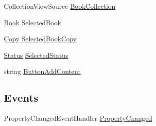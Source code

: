 \begin{DoxyCompactItemize}
\item 
Collection\+View\+Source \mbox{\hyperlink{class_easy_library_application_1_1_w_p_f_1_1_view_model_1_1_c_r_u_d_book_copies_view_model_aabe62d67d4900559ca92487dcaae6f9c}{Book\+Collection}}
\item 
\mbox{\hyperlink{class_easy_library_application_1_1_w_p_f_1_1_model_1_1_book}{Book}} \mbox{\hyperlink{class_easy_library_application_1_1_w_p_f_1_1_view_model_1_1_c_r_u_d_book_copies_view_model_ac1b60964461217810ccf17c7a8083fb8}{Selected\+Book}}
\item 
\mbox{\hyperlink{class_easy_library_application_1_1_w_p_f_1_1_model_1_1_copy}{Copy}} \mbox{\hyperlink{class_easy_library_application_1_1_w_p_f_1_1_view_model_1_1_c_r_u_d_book_copies_view_model_adb9694f778c8923761db54efd8f4e9db}{Selected\+Book\+Copy}}
\item 
\mbox{\hyperlink{class_easy_library_application_1_1_w_p_f_1_1_model_1_1_status}{Status}} \mbox{\hyperlink{class_easy_library_application_1_1_w_p_f_1_1_view_model_1_1_c_r_u_d_book_copies_view_model_ad530f27396e31fe66450421951a293b8}{Selected\+Status}}
\item 
string \mbox{\hyperlink{class_easy_library_application_1_1_w_p_f_1_1_view_model_1_1_c_r_u_d_book_copies_view_model_af9c417ecd957c7a2c734d00b26b1c661}{Button\+Add\+Content}}
\end{DoxyCompactItemize}
\subsection*{Events}
\begin{DoxyCompactItemize}
\item 
Property\+Changed\+Event\+Handler \mbox{\hyperlink{class_easy_library_application_1_1_w_p_f_1_1_view_model_1_1_c_r_u_d_book_copies_view_model_a6529d7bba6a6eca35f5d991c48dd8fdc}{Property\+Changed}}
\end{DoxyCompactItemize}


